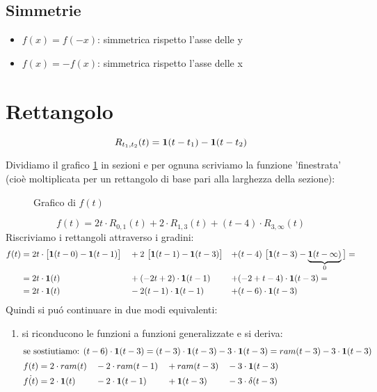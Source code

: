 \documentclass[../main.tex]{subfiles}
\begin{document}
	\subsection{Simmetrie}
		\begin{itemize}
			\item $ f(x) = f(-x) $: simmetrica rispetto l'asse delle y
			\item $ f(x) = -f(x) $: simmetrica rispetto l'asse delle x  	
		\end{itemize}
	\section{Rettangolo}
		$$ R_{t_{1},t_{2}}(t) = \gr[t - t_{1}] - \gr[t - t_{2}] $$
		
	\begin{Exercise}[title={Derivata di una funzione definita a tratti}, difficulty=3]
		Dividiamo il grafico \ref{fig:grafico_f} in sezioni e per ognuna scriviamo la funzione 'finestrata' (cioè moltiplicata per un rettangolo di base pari alla larghezza della sezione):
		\begin{figure}[h!]
			\centering
			\resizebox{.7\columnwidth}{!}{}
			\caption{Grafico di $ f(t) $}
			\label{fig:grafico_f}
		\end{figure}
		$$ f(t) = 2t \cdot R_{0,1}(t) + 2 \cdot R_{1,3}(t) + (t-4) \cdot R_{3,\infty}(t) $$
		Riscriviamo i rettangoli attraverso i gradini:
		\begin{align*}
			f(t) &= 2t \cdot \big[ \gr[t-0] - \gr[t-1] \big] &&+ 2\ \big[\gr[t-1] - \gr[t-3]\big] & +&(t-4)\ \big[\gr[t-3] - \underbrace{\gr[t - \infty]}_{0} \big] =\\
			&= 2t \cdot \gr[t] &&+ (-2t+2) \cdot \gr[t-1] & +&(-2+t-4) \cdot \gr[t-3] =\\
			&= 2t \cdot \gr[t] &&- 2(t-1) \cdot \gr[t-1] & +&(t-6) \cdot \gr[t-3]
		\end{align*}
		Quindi si pu\'o continuare in due modi equivalenti:
		\begin{enumerate}
			\item si riconducono le funzioni a funzioni generalizzate e si deriva:
				\begin{align}
					\intertext{se sostiutiamo: $ (t-6) \cdot \gr[t-3] = (t-3) \cdot \gr[t-3] - 3 \cdot \gr[t-3] = ram(t-3) - 3 \cdot \gr[t-3] $}
					f(t) &= 2 \cdot ram(t) &&- 2 \cdot ram(t-1) &&+ram(t-3) &&- 3 \cdot \gr[t-3] \nonumber\\
					\dot{f(t)} &= 2 \cdot \textbf{1}(t) &&- 2 \cdot \gr[t-1] &&+ \gr[t-3] && - 3 \cdot \delta(t-3)

\end{align}
\end{enumerate}
\end{Exercise}
\end{document}
